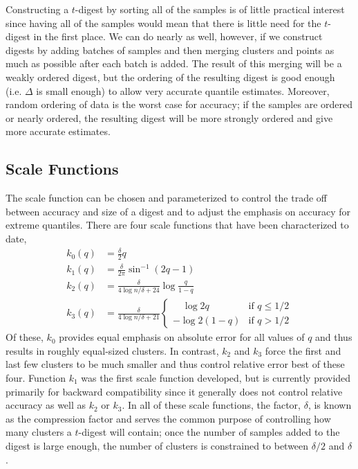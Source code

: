 \documentclass{vldb}
\begin{document}
Constructing a $t$-digest by sorting all of the samples is of little practical interest since having all of the samples would mean that there is little need for the $t$-digest in the first place. We can do nearly as well, however, if we construct digests by adding batches of samples and then merging clusters and points as much as possible after each batch is added. The result of this merging will be a weakly ordered digest, but the ordering of the resulting digest is good enough (i.e. $\Delta$ is small enough) to allow very accurate quantile estimates. Moreover, random ordering of data is the worst case for accuracy; if the samples are ordered or nearly ordered, the resulting digest will be more strongly ordered and give more accurate estimates.
\subsection{Scale Functions}
The scale function can be chosen and parameterized to control the trade off between accuracy and size of a digest and to adjust the emphasis on accuracy for extreme quantiles. There are four scale functions that have been characterized to date,
\begin{align}
k_0(q) &= \frac \delta 2 q \\
k_1(q) &= \frac \delta {2\pi}  \sin^{-1}(2q-1)   \\
k_2(q) &= \frac \delta {4 \log n/\delta + 24} \log {\frac q {1-q}} \\
k_3(q) &= \frac \delta {4\log n/\delta + 21}\begin{cases}
\quad \log 2q & \text{if  } q \le 1/2 \\
- \log 2(1-q) & \text{if  } q > 1/2
\end{cases}
\end{align}
Of these, $k_0$ provides equal emphasis on absolute error for all values of $q$ and thus results in roughly equal-sized clusters. In contrast, $k_2$ and $k_3$ force the first and last few clusters to be much smaller and thus control relative error best of these four. Function $k_1$ was the first scale function developed, but is currently provided primarily for backward compatibility since it generally does not control relative accuracy as well as $k_2$ or $k_3$. In all of these scale functions, the factor, $\delta$, is known as the compression factor and serves the common purpose of controlling how many clusters a $t$-digest will contain; once the number of samples added to the digest is large enough, the number of clusters is constrained to  between $\delta/2$ and $\delta$.
\end{document}
